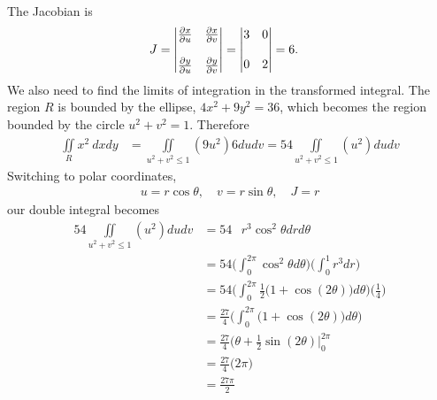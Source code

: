 \item %
 \\
The Jacobian is
\begin{align*}   J &=  
  \begin{vmatrix}
   \frac{\partial x}{\partial u} &  \frac{\partial x}{\partial v} \\ \\
   \frac{\partial y}{\partial u} & \frac{\partial y}{\partial v} \\
  \end{vmatrix}
  =     \begin{vmatrix}
   3 & 0 \\ \\
   0 & 2 \\
  \end{vmatrix}
  = 6 .
 \end{align*}
We also need to find the limits of integration in the transformed integral. The region $R$ is bounded by the ellipse, $4x^2 + 9y^2 = 36$, which becomes the region bounded by the circle $u^2 + v^2 = 1$. Therefore
\begin{align*}
  \iint\limits_R x^2 \ dxdy &= \iint\limits_{u^2 + v^2 \le 1} (9u^2) 6dudv =  54 \iint\limits_{u^2 + v^2 \le 1} (u^2) dudv
\end{align*}
Switching to polar coordinates, 
\begin{align*}
  u = r\cos\theta, \quad v = r\sin\theta, \quad J = r
\end{align*}
our double integral becomes
\begin{align*}
  54 \iint\limits_{u^2 + v^2 \le 1} (u^2) dudv 
  & = 54 \mathop{\int_0^{2\pi} \!\! \int_0^1} r^3\cos^2\theta drd\theta  \\
  & = 54 \Bigg( \int_0^{2\pi} \cos^2\theta d\theta \Bigg)\Bigg( \int_0^1 r^3 dr \Bigg) \\
  & = 54 \Bigg( \int_0^{2\pi} \frac{1}{2} \big(1+\cos(2\theta) \big) d\theta \Bigg) \Bigg( \frac{1}{4} \Bigg) \\
  & =\frac{27}{4} \Bigg( \int_0^{2\pi}  \big(1+\cos(2\theta) \big) d\theta \Bigg) \\
  & =\frac{27}{4} \big(\theta+\frac{1}{2}\sin(2\theta) \big|_0^{2\pi}  \\
  & =\frac{27}{4} \big(2\pi\big)  \\
  & =\frac{27\pi}{2} 
\end{align*}
\item %
